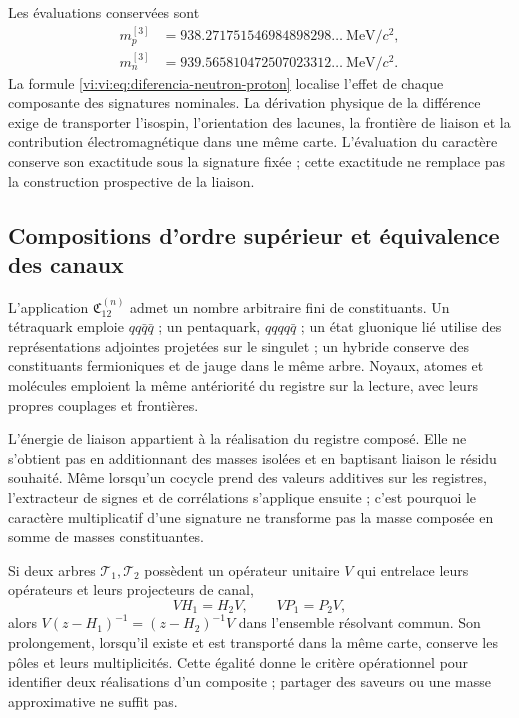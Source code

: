Les évaluations conservées sont
\begin{align*}
 m_p^{[3]}&=938.271751546984898298\ldots\ \mathrm{MeV}/c^2,\\
 m_n^{[3]}&=939.565810472507023312\ldots\ \mathrm{MeV}/c^2.
\end{align*}
La formule \eqref{vi:vi:eq:diferencia-neutron-proton} localise l'effet de
chaque composante des signatures nominales. La dérivation physique de la
différence exige de transporter l'isospin, l'orientation des lacunes,
la frontière de liaison et la contribution électromagnétique dans une même carte.
L'évaluation du caractère conserve son exactitude sous la signature fixée ;
cette exactitude ne remplace pas la construction prospective de la liaison.

\subsection{Compositions d’ordre supérieur et équivalence des canaux}
\label{vi:vi:subsec:compuestos-superiores}

L’application \(\mathfrak C_{12}^{(n)}\) admet un nombre arbitraire
fini de constituants. Un tétraquark emploie \(qq\bar q\bar q\) ;
un pentaquark, \(qqqq\bar q\) ; un état gluonique lié utilise
des représentations adjointes projetées sur le singulet ; un hybride conserve
des constituants fermioniques et de jauge dans le même arbre. Noyaux,
atomes et molécules emploient la même antériorité du registre sur la lecture,
avec leurs propres couplages et frontières.

L’énergie de liaison appartient à la réalisation du registre composé.
Elle ne s’obtient pas en additionnant des masses isolées et en baptisant liaison le
résidu souhaité. Même lorsqu’un cocycle prend des valeurs additives sur
les registres, l’extracteur de signes et de corrélations s’applique ensuite ;
c’est pourquoi le caractère multiplicatif d’une signature ne transforme pas la masse
composée en somme de masses constituantes.

Si deux arbres \(\mathcal T_1,\mathcal T_2\) possèdent un opérateur unitaire
\(V\) qui entrelace leurs opérateurs et leurs projecteurs de canal,
\[
 VH_1=H_2V,\qquad VP_1=P_2V,
\]
alors \(V(z-H_1)^{-1}=(z-H_2)^{-1}V\) dans l'ensemble résolvant commun.
Son prolongement, lorsqu'il existe et est transporté dans la même carte,
conserve les pôles et leurs multiplicités. Cette égalité donne le critère
opérationnel pour identifier deux réalisations d'un composite ; partager
des saveurs ou une masse approximative ne suffit pas.

